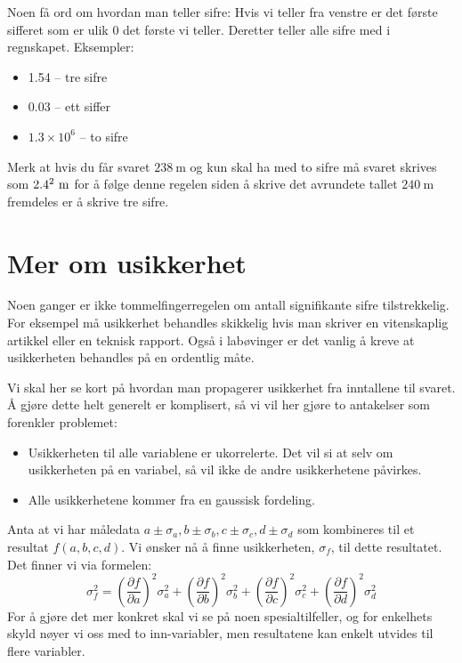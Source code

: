 \documentclass[a4paper,norsk,12pt]{book}
\begin{document}
Noen få ord om hvordan man teller sifre: Hvis vi teller fra venstre er det første sifferet som er ulik 0 det første vi teller. Deretter teller alle sifre med i regnskapet. Eksempler:
\begin{itemize}
	\item 1.54 -- tre sifre
	\item 0.03 -- ett siffer
	\item$1.3\times10^6$ -- to sifre
\end{itemize}
Merk at hvis du får svaret $238~\mathrm{m}$ og kun skal ha med to sifre må svaret skrives som $2.4\time10^2~\mathrm{m}$ for å følge denne regelen siden å skrive det avrundete tallet $240~\mathrm{m}$ fremdeles er å skrive tre sifre.

\section{Mer om usikkerhet}
Noen ganger er ikke tommelfingerregelen om antall signifikante sifre tilstrekkelig. For eksempel må usikkerhet behandles skikkelig hvis man skriver en vitenskaplig artikkel eller en teknisk rapport. Også i labøvinger er det vanlig å kreve at usikkerheten behandles på en ordentlig måte. 

Vi skal her se kort på hvordan man propagerer usikkerhet fra inntallene til svaret. Å gjøre dette helt generelt er komplisert, så vi vil her gjøre to antakelser som forenkler problemet:
\begin{itemize}
\item
Usikkerheten til alle variablene er ukorrelerte. Det vil si at selv om usikkerheten på en variabel, så vil ikke de andre 	usikkerhetene påvirkes.
\item
Alle usikkerhetene kommer fra en gaussisk fordeling. 
\end{itemize}
Anta at vi har måledata $a\pm\sigma_a,b\pm\sigma_b,c\pm\sigma_c,d\pm\sigma_d$ som kombineres til et resultat $f(a,b,c,d)$. Vi ønsker nå å finne usikkerheten, $\sigma_f$, til dette resultatet. Det finner vi via formelen:
\begin{displaymath}
	\sigma_f^2 =
	\left(\frac{\partial f}{\partial a}\right)^2\sigma_a^2 + \left(\frac{\partial f}{\partial b}\right)^2\sigma_b^2 + 
	\left(\frac{\partial f}{\partial c}\right)^2\sigma_c^2 + \left(\frac{\partial f}{\partial d}\right)^2\sigma_d^2 
\end{displaymath}
For å gjøre det mer konkret skal vi se på noen spesialtilfeller, og for enkelhets skyld nøyer vi oss med to inn-variabler, men resultatene kan enkelt utvides til flere variabler.
\end{document}
